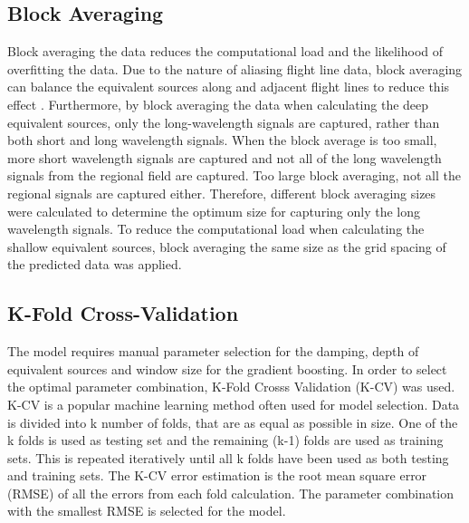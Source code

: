 \subsection{Block Averaging}
Block averaging the data reduces the computational load and the likelihood of overfitting the data. Due to the nature of aliasing flight line data, block averaging can balance the equivalent sources along and adjacent flight lines to reduce this effect \cite{SolerUieda2021}. Furthermore, by block averaging the data when calculating the deep equivalent sources, only the long-wavelength signals are captured, rather than both short and long wavelength signals. When the block average is too small, more short wavelength signals are captured and not all of the long wavelength signals from the regional field are captured. Too large block averaging, not all the regional signals are captured either. Therefore, different block averaging sizes were calculated to determine the optimum size for capturing only the long wavelength signals. To reduce the computational load when calculating the shallow equivalent sources, block averaging the same size as the grid spacing of the predicted data was applied.

\subsection{K-Fold Cross-Validation}
The model requires manual parameter selection for the damping, depth of equivalent sources and window size for the gradient boosting. In order to select the optimal parameter combination, K-Fold Crosss Validation (K-CV) was used. K-CV is a popular machine learning method often used for model selection. Data is divided into k number of folds, that are as equal as possible in size. One of the k folds is used as testing set and the remaining (k-1) folds are used as training sets. This is repeated iteratively until all k folds have been used as both testing and training sets. The K-CV error estimation is the root mean square error (RMSE) of all the errors from each fold calculation. The parameter combination with the smallest RMSE is selected for the model.




